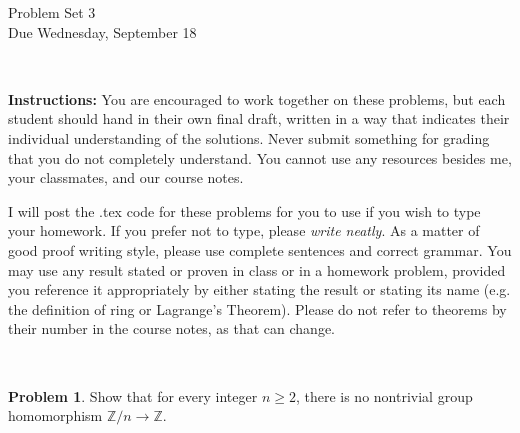 \documentclass[11pt]{article}
\title{}
\date{\vspace{-0.5in}}
\newcommand{\ZZ}{\mathbb{Z}}
\theoremstyle{definition}
\newtheorem{problem}{Problem}
\begin{document}
\thispagestyle{fancy}
\pagestyle{fancy}

\vspace{3em}

\begin{center}
	{\LARGE Problem Set 3 \\}
	Due Wednesday, September 18
\end{center}

\

\noindent
{\bf Instructions:}
You are encouraged to work together on these problems, but each student should hand in their own final draft, written in a way that indicates their individual understanding of the solutions. Never submit something for grading that you do not completely understand. You cannot use any resources besides me, your classmates, and our course notes.


I will post the .tex code for these problems for you to use if you wish to type your homework. If you prefer not to type, please  {\em write neatly}. As a matter of good proof writing style, please use complete sentences and correct grammar. You may use any result  stated or proven in class or in a homework problem, provided you reference it appropriately by either stating the result or stating its name (e.g. the definition of ring or Lagrange's Theorem). Please do not refer to theorems by their number in the course notes, as that can change.


\





\begin{problem}
Show that for every integer $n \geqslant 2$, there is no nontrivial group homomorphism $\ZZ/n \longrightarrow \ZZ$.
\end{problem}

\

\noindent
\hspace{0.5em}
 
\end{document}

